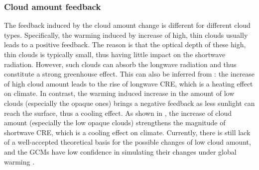 \subsubsection{Cloud amount feedback}
The feedback induced by the cloud amount change is different for different cloud types. Specifically, the warming induced
by increase of high, thin clouds usually leads to a positive feedback. The reason is that the optical depth of these high,
thin clouds is typically small, thus having little impact on the shortwave radiation. However, such clouds can absorb the longwave radiation and thus constitute a strong greenhouse effect. This can also be inferred from : the increase of high cloud amount leads to the rise of longwave CRE, which is a heating effect on climate. In contrast, the warming induced increase in the amount of low clouds (especially the opaque ones) brings a negative feedback as less sunlight can reach the surface, thus a cooling effect. As shown in , the increase of cloud amount (especially the low opaque clouds) strengthens the magnitude of shortwave CRE, which is a cooling effect on climate. Currently, there is still lack of a well-accepted theoretical basis for the possible changes of low cloud amount, and the GCMs have low confidence in simulating their changes under global warming \citep{Stocker2013}.


